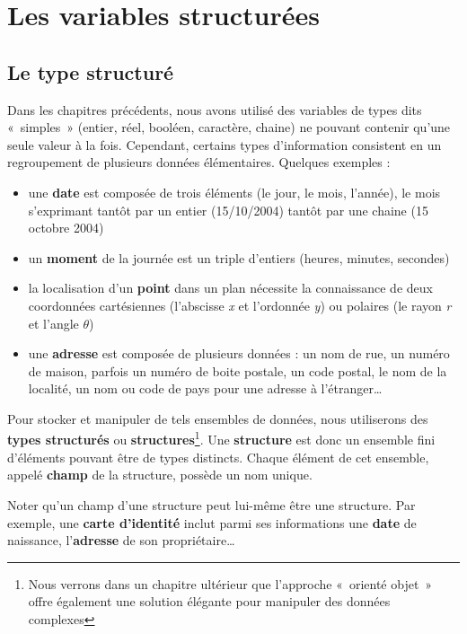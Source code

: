 \chapter{Les variables structurées}

\section{Le type structuré}

	Dans les chapitres précédents, nous avons utilisé des variables de types
	dits «~simples~» (entier, réel, booléen, caractère, chaine) ne pouvant
	contenir qu’une seule valeur à la fois. Cependant, certains types
	d’information consistent en un regroupement de plusieurs données
	élémentaires. Quelques exemples :

	\begin{itemize}
	\item {
		une \textbf{date} est composée de trois éléments (le jour, le mois,
		l’année), le mois s’exprimant tantôt par un entier (15/10/2004) tantôt
		par une chaine (15 octobre 2004)}
	\item {
		un \textbf{moment} de la journée est un triple d’entiers (heures,
		minutes, secondes)}
	\item {
		la localisation d’un \textbf{point} dans un plan nécessite la
		connaissance de deux coordonnées cartésiennes (l’abscisse \textit{x} et
		l’ordonnée \textit{y}) ou polaires (le rayon \textit{r} et l’angle
		\textit{$\theta $})}
	\item {
		une \textbf{adresse }est composée de plusieurs données : un nom de rue,
		un numéro de maison, parfois un numéro de boite postale, un code
		postal, le nom de la localité, un nom ou code de pays pour une adresse
		à l’étranger\dots}
	\end{itemize}

	Pour stocker et manipuler de tels ensembles de données, nous utiliserons
	des \textbf{types structurés} ou \textbf{structures}\footnote{Nous
	verrons dans un chapitre ultérieur que l'approche
	«~orienté objet~» offre également une solution élégante pour manipuler
	des données complexes}. Une \textbf{structure} est donc un ensemble
	fini d’éléments pouvant être de types distincts. Chaque élément de cet
	ensemble, appelé \textbf{champ} de la structure, possède un nom unique.
	
	Noter qu’un champ d’une structure peut lui-même être une structure. Par
	exemple, une \textbf{carte d’identité} inclut parmi ses informations
	une \textbf{date} de naissance, l’\textbf{adresse} de son
	propriétaire\dots

